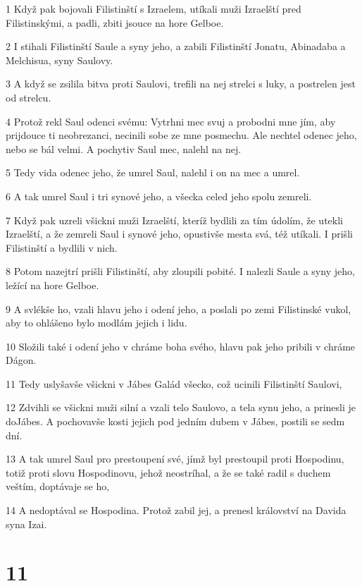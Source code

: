 \par 1 Když pak bojovali Filistinští s Izraelem, utíkali muži Izraelští pred Filistinskými, a padli, zbiti jsouce na hore Gelboe.
\par 2 I stihali Filistinští Saule a syny jeho, a zabili Filistinští Jonatu, Abinadaba a Melchisua, syny Saulovy.
\par 3 A když se zsilila bitva proti Saulovi, trefili na nej strelci s luky, a postrelen jest od strelcu.
\par 4 Protož rekl Saul odenci svému: Vytrhni mec svuj a probodni mne jím, aby prijdouce ti neobrezanci, necinili sobe ze mne posmechu. Ale nechtel odenec jeho, nebo se bál velmi. A pochytiv Saul mec, nalehl na nej.
\par 5 Tedy vida odenec jeho, že umrel Saul, nalehl i on na mec a umrel.
\par 6 A tak umrel Saul i tri synové jeho, a všecka celed jeho spolu zemreli.
\par 7 Když pak uzreli všickni muži Izraelští, kteríž bydlili za tím údolím, že utekli Izraelští, a že zemreli Saul i synové jeho, opustivše mesta svá, též utíkali. I prišli Filistinští a bydlili v nich.
\par 8 Potom nazejtrí prišli Filistinští, aby zloupili pobité. I nalezli Saule a syny jeho, ležící na hore Gelboe.
\par 9 A svlékše ho, vzali hlavu jeho i odení jeho, a poslali po zemi Filistinské vukol, aby to ohlášeno bylo modlám jejich i lidu.
\par 10 Složili také i odení jeho v chráme boha svého, hlavu pak jeho pribili v chráme Dágon.
\par 11 Tedy uslyšavše všickni v Jábes Galád všecko, což ucinili Filistinští Saulovi,
\par 12 Zdvihli se všickni muži silní a vzali telo Saulovo, a tela synu jeho, a prinesli je doJábes. A pochovavše kosti jejich pod jedním dubem v Jábes, postili se sedm dní.
\par 13 A tak umrel Saul pro prestoupení své, jímž byl prestoupil proti Hospodinu, totiž proti slovu Hospodinovu, jehož neostríhal, a že se také radil s duchem veštím, doptávaje se ho,
\par 14 A nedoptával se Hospodina. Protož zabil jej, a prenesl království na Davida syna Izai.

\chapter{11}

